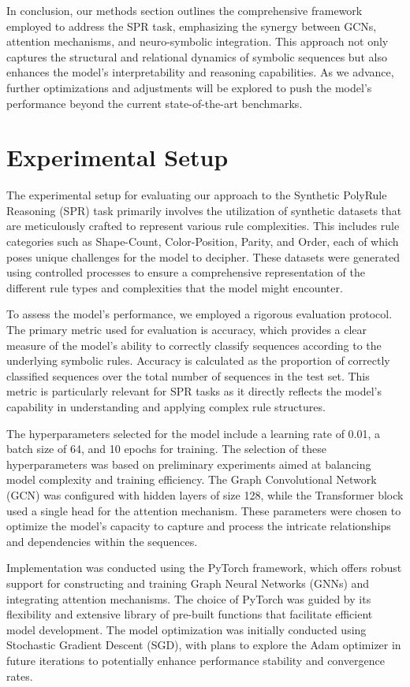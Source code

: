 \documentclass{article}
\begin{document}
In conclusion, our methods section outlines the comprehensive framework employed to address the SPR task, emphasizing the synergy between GCNs, attention mechanisms, and neuro-symbolic integration. This approach not only captures the structural and relational dynamics of symbolic sequences but also enhances the model's interpretability and reasoning capabilities. As we advance, further optimizations and adjustments will be explored to push the model's performance beyond the current state-of-the-art benchmarks.

\section{Experimental Setup}
The experimental setup for evaluating our approach to the Synthetic PolyRule Reasoning (SPR) task primarily involves the utilization of synthetic datasets that are meticulously crafted to represent various rule complexities. This includes rule categories such as Shape-Count, Color-Position, Parity, and Order, each of which poses unique challenges for the model to decipher. These datasets were generated using controlled processes to ensure a comprehensive representation of the different rule types and complexities that the model might encounter.

To assess the model's performance, we employed a rigorous evaluation protocol. The primary metric used for evaluation is accuracy, which provides a clear measure of the model's ability to correctly classify sequences according to the underlying symbolic rules. Accuracy is calculated as the proportion of correctly classified sequences over the total number of sequences in the test set. This metric is particularly relevant for SPR tasks as it directly reflects the model's capability in understanding and applying complex rule structures.

The hyperparameters selected for the model include a learning rate of 0.01, a batch size of 64, and 10 epochs for training. The selection of these hyperparameters was based on preliminary experiments aimed at balancing model complexity and training efficiency. The Graph Convolutional Network (GCN) was configured with hidden layers of size 128, while the Transformer block used a single head for the attention mechanism. These parameters were chosen to optimize the model's capacity to capture and process the intricate relationships and dependencies within the sequences.

Implementation was conducted using the PyTorch framework, which offers robust support for constructing and training Graph Neural Networks (GNNs) and integrating attention mechanisms. The choice of PyTorch was guided by its flexibility and extensive library of pre-built functions that facilitate efficient model development. The model optimization was initially conducted using Stochastic Gradient Descent (SGD), with plans to explore the Adam optimizer in future iterations to potentially enhance performance stability and convergence rates.
\end{document}
